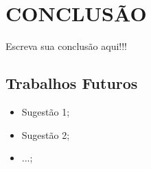 
\chapter{CONCLUSÃO}
\label{chap:conclusao}

Escreva sua conclusão aqui!!!

\section{Trabalhos Futuros}
\label{sec:trabalhosFuturos}

\begin{itemize}
\item Sugestão 1;
\item Sugestão 2;
\item ...;
\end{itemize}
